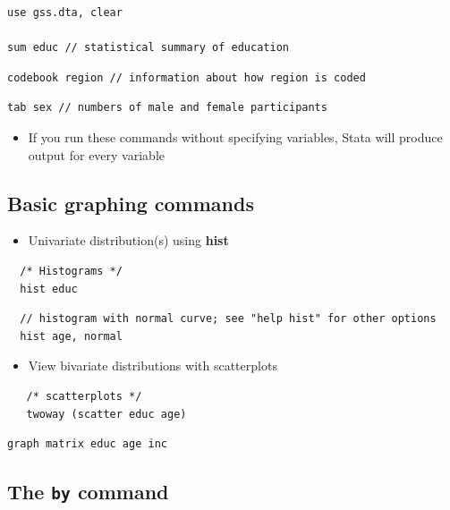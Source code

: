 \documentclass[]{book}
\providecommand{\tightlist}{%
  \setlength{\itemsep}{0pt}\setlength{\parskip}{0pt}}
\begin{document}
\begin{verbatim}
use gss.dta, clear

sum educ // statistical summary of education
\end{verbatim}

\begin{verbatim}
codebook region // information about how region is coded
\end{verbatim}

\begin{verbatim}
tab sex // numbers of male and female participants
\end{verbatim}

\begin{itemize}
\tightlist
\item
  If you run these commands without specifying variables, Stata will
  produce output for every variable
\end{itemize}

\subsection{Basic graphing commands}\label{basic-graphing-commands}

\begin{itemize}
\tightlist
\item
  Univariate distribution(s) using \textbf{hist}
\end{itemize}

\begin{verbatim}
  /* Histograms */
  hist educ
\end{verbatim}

\begin{verbatim}
  // histogram with normal curve; see "help hist" for other options
  hist age, normal  
\end{verbatim}

\begin{itemize}
\tightlist
\item
  View bivariate distributions with scatterplots
\end{itemize}

\begin{verbatim}
   /* scatterplots */
   twoway (scatter educ age)
\end{verbatim}

\begin{verbatim}
graph matrix educ age inc
\end{verbatim}

\subsection{\texorpdfstring{The \texttt{by}
command}{The by command}}\label{the-by-command}
\end{document}

